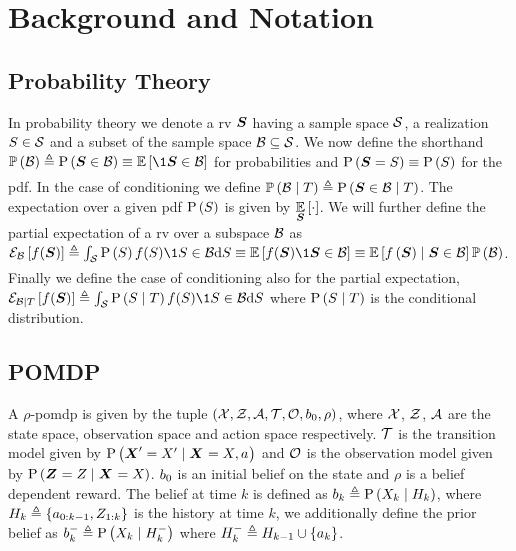 \chapter{Background and Notation}

\section{Probability Theory}
In probability theory we denote a \gls{rv} $\boldsymbol S$ having a sample space $\mathcal S$, a realization $S\in\mathcal S$ and a subset of the sample space $\mathcal B\subseteq\mathcal S$. We now define the shorthand $\measure{\subSpace}\triangleq\prob{\RV\in\subSpace}\equiv\expectation{\1{\RV\in \subSpace}}{}$ for probabilities and $\mathrm{P}\left({\boldsymbol S=S}\right)\equiv\mathrm{P}\left({S}\right)$ for the \gls{pdf}. In the case of conditioning we define $\mathbb{P}\left({\mathcal B\mid T}\right)\triangleq\mathrm{P}\left({\boldsymbol S\in\mathcal B\mid T}\right)$. The expectation over a given \gls{pdf} $\mathrm{P}\left({S}\right)$ is given by $\operatorname*{\mathbb{E}}\limits_{\boldsymbol S}\left[{\cdot}\right]$. We will further define the partial expectation of a \gls{rv} over a subspace $\mathcal B$ as
$\partialexpectation{f(\RV)}{\subSpace}\triangleq\int_\Space \prob{\variable}f(\variable)\1{\variable\in\subSpace}\D\variable\equiv\expectation{f(\RV)\1{\RV\in\subSpace}}{}\equiv\expectation{f\left(\RV\right)\mid\RV\in\subSpace}{}\measure{\subSpace}$. Finally we define the case of conditioning also for the partial expectation, $\partialexpectation{f(\RV)}{\subSpace\mid\variableI}\triangleq\int_\Space \prob{\variable\mid\variableI}f(\variable)\1{\variable\in\subSpace}\D\variable$ where $\mathrm{P}\left({S\mid T}\right)$ is the conditional distribution.

\section{POMDP}
A $\rho$-\gls{pomdp} is given by the tuple $(\mathcal X,\mathcal Z,\mathcal A,\mathcal T,\mathcal O,b_{0},\rho)$, where $\mathcal X$, $\mathcal Z$, $\mathcal A$ are the state space, observation space and action space respectively. $\mathcal T$ is the transition model given by $\mathrm{P}\left({\boldsymbol X_{}^\prime=X_{}^\prime}\mid{\ensuremath{\boldsymbol X_{}}=\ensuremath{X_{}},\ensuremath{{a_{}}}}\right)$ and $\mathcal O$ is the observation model given by $\mathrm{P}\left({\boldsymbol Z_{}=Z_{}}\mid{\ensuremath{\boldsymbol X_{}}=\ensuremath{X_{}}}\right)$. $b_{0}$ is an initial belief on the state and $\rho$ is a belief dependent reward. The belief at time $k$ is defined as $b_{k}\triangleq\mathrm{P}\left({X_{k}}\mid{\ensuremath{H_{k}}}\right)$, where $H_{k}\triangleq\{{a_{0:k-1}},Z_{1:k}\}$ is the history at time $k$, we additionally define the prior belief as $b_{k}^-\triangleq\mathrm{P}\left({X_{k}}\mid{\ensuremath{H_{k}^-}}\right)$ where $H_{k}^-\triangleq H_{k-1}\cup\{{a_{k}}\}$.

